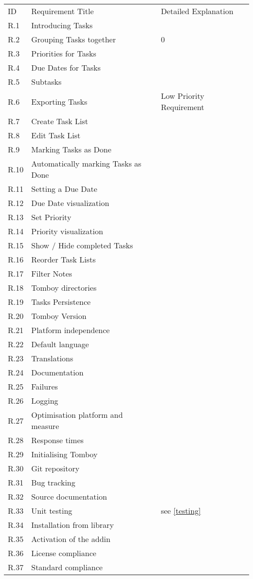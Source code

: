\begin{tabular}{lll}
\rowcolor[gray]{0.9}
ID  & Requirement Title   & Detailed Explanation	\\
\completed	R.1		& Introducing Tasks   & 						\\
\completed	R.2		& Grouping Tasks together & 0   \\
\completed	R.3		& Priorities for Tasks & \\
\completed	R.4		& Due Dates for Tasks & \\
\completed	R.5		& Subtasks & \\
\notdone	R.6		& Exporting Tasks & Low Priority Requirement\\
\completed	R.7		& Create Task List & \\
\completed	R.8		& Edit Task List & \\
\completed	R.9		& Marking Tasks as Done & \\
\completed	R.10	& Automatically marking Tasks as Done & \\
\completed	R.11	& Setting a Due Date & \\
\parts		R.12	& Due Date visualization & \\
\completed	R.13	& Set Priority & \\
\completed	R.14	& Priority visualization & \\
\notdone	R.15	& Show / Hide completed Tasks & \\
\notdone	R.16	& Reorder Task Lists & \\
\completed	R.17	& Filter Notes & \\
\completed	R.18	& Tomboy directories & \\
\completed	R.19	& Tasks Persistence & \\
\notdone	R.20	& Tomboy Version & \\
\parts		R.21	& Platform independence & \\
\completed	R.22	& Default language & \\
\completed	R.23	& Translations & \\
\completed	R.24	& Documentation & \\
\completed	R.25	& Failures & \\
\completed	R.26	& Logging & \\
\completed	R.27	& Optimisation platform and measure & \\
\completed	R.28	& Response times & \\
\completed	R.29	& Initialising Tomboy & \\
\completed	R.30	& Git repository & \\
\completed	R.31	& Bug tracking & \\
\completed	R.32	& Source documentation & \\
\parts		R.33	& Unit testing & see \ref{testing}\\
\completed	R.34	& Installation from library & \\
\completed	R.35	& Activation of the addin & \\
\completed	R.36	& License compliance & \\
\completed	R.37	& Standard compliance & \\
\end{tabular}


